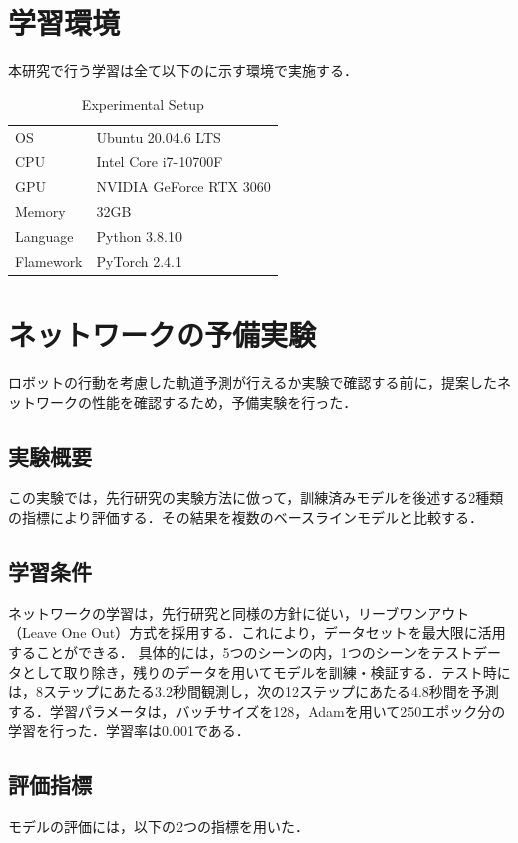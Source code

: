 \newpage

\section{学習環境}
本研究で行う学習は全て以下のに示す環境で実施する．

\begin{table}[hbtp]
  \centering
  \caption{Experimental Setup}
  \label{tab:environment}
  \begin{tabular}{ll}
    \hline
    OS & Ubuntu 20.04.6 LTS \\
    CPU & Intel Core i7-10700F \\
    GPU & NVIDIA GeForce RTX 3060 \\
    Memory & 32GB \\
    Language & Python 3.8.10 \\
    Flamework & PyTorch 2.4.1 \\
    \hline
  \end{tabular}
\end{table}

\section{ネットワークの予備実験}
ロボットの行動を考慮した軌道予測が行えるか実験で確認する前に，提案したネットワークの性能を確認するため，予備実験を行った．

\subsection{実験概要}
この実験では，先行研究\cite{s-stgcnn}の実験方法に倣って，訓練済みモデルを後述する2種類の指標により評価する．その結果を複数のベースラインモデルと比較する．

\subsection{学習条件}
ネットワークの学習は，先行研究\cite{s-lstm,s-stgcnn}と同様の方針に従い，リーブワンアウト（Leave One Out）方式を採用する．これにより，データセットを最大限に活用することができる．
具体的には，5つのシーンの内，1つのシーンをテストデータとして取り除き，残りのデータを用いてモデルを訓練・検証する．テスト時には，8ステップにあたる3.2秒間観測し，次の12ステップにあたる4.8秒間を予測する．学習パラメータは，バッチサイズを128，Adam\cite{kingma2014adam}を用いて250エポック分の学習を行った．学習率は0.001である．

\subsection{評価指標}
モデルの評価には，以下の2つの指標を用いた．

